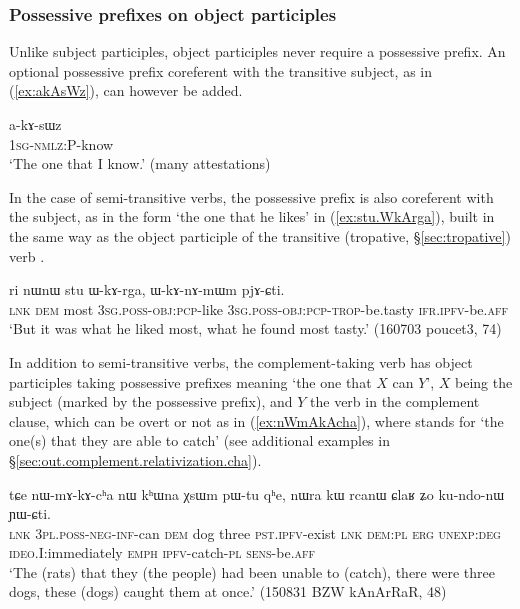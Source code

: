 \subsubsection{Possessive prefixes on object participles}  \label{sec:object.participle.possessive} 
Unlike subject participles, object participles never require a possessive prefix. An optional possessive prefix coreferent with the transitive subject, as in (\ref{ex:akAsWz}), can however be added.
  
  \begin{exe}
\ex \label{ex:akAsWz}
\gll a-kɤ-sɯz    \\
   \textsc{1sg}-\textsc{nmlz}:P-know \\
 \glt  `The one that I know.' (many attestations)
 \end{exe}

In the case of semi-transitive verbs, the possessive prefix is also coreferent with the subject, as in the form  `the one that he likes' in (\ref{ex:stu.WkArga}), built in the same way as the object participle of the transitive (tropative, §\ref{sec:tropative}) verb .

\begin{exe}
\ex \label{ex:stu.WkArga}
\gll ri nɯnɯ stu ɯ-kɤ-rga, ɯ-kɤ-nɤ-mɯm pjɤ-ɕti. \\
\textsc{lnk} \textsc{dem}  most \textsc{3sg}.\textsc{poss}-\textsc{obj}:\textsc{pcp}-like \textsc{3sg}.\textsc{poss}-\textsc{obj}:\textsc{pcp}-\textsc{trop}-be.tasty \textsc{ifr}.\textsc{ipfv}-be.\textsc{aff} \\
\glt `But it was what he liked most, what he found most tasty.' (160703 poucet3, 74)
\end{exe}

In addition to semi-transitive verbs, the complement-taking verb  has object participles taking possessive prefixes meaning `the one that $X$ can $Y$', $X$ being the subject (marked by the possessive prefix), and $Y$ the verb in the complement clause, which can be overt or not as in (\ref{ex:nWmAkAcha}), where  stands for  `the one(s) that they are able to catch' (see additional examples in §\ref{sec:out.complement.relativization.cha}).
 
\begin{exe}
\ex  \label{ex:nWmAkAcha}
\gll tɕe nɯ-mɤ-kɤ-cʰa nɯ kʰɯna χsɯm pɯ-tu qʰe, nɯra kɯ rcanɯ ɕlaʁ ʑo ku-ndo-nɯ ɲɯ-ɕti. \\
\textsc{lnk} \textsc{3pl}.\textsc{poss}-\textsc{neg}-\textsc{inf}-can \textsc{dem} dog three \textsc{pst}.\textsc{ipfv}-exist \textsc{lnk} \textsc{dem}:\textsc{pl} \textsc{erg} \textsc{unexp}:\textsc{deg} \textsc{ideo}.I:immediately \textsc{emph} \textsc{ipfv}-catch-\textsc{pl} \textsc{sens}-be.\textsc{aff} \\
\glt `The (rats) that they (the people) had been unable to (catch), there were three dogs, these (dogs) caught them at once.' (150831 BZW kAnArRaR, 48)
\end{exe}

